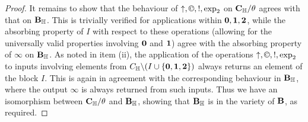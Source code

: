 \documentclass[eqnor,reqno]{amsart}
\theoremstyle{plain}
\theoremstyle{definition}
\newcommand{\cc}{\mathbin{\textup{\copyright}}}
\begin{document}
\begin{proof}
It remains to show that the behaviour of $\uparrow,\cc,!,\exp_2$ on ${\bf C}_\mathbb{H}/\theta$ agrees with that on ${\bf B}_\mathbb{H}$.  This is trivially verified for applications within ${\bf 0},{\bf 1},{\bf 2}$, while the absorbing property of $I$ with respect to these operations (allowing for the universally valid properties involving ${\bf 0}$ and ${\bf 1}$) agree with the absorbing property of $\infty$ on ${\bf B}_\mathbb{H}$.  As noted in item (ii), the application of the operations $\uparrow,\cc,!,\exp_2$ to inputs involving elements from $C_\mathbb{H}\backslash(I\cup\{{\bf 0},{\bf 1},{\bf 2}\})$ always returns an element of the block $I$.  This is again in agreement with the corresponding behaviour in ${\bf B}_\mathbb{H}$, where the output $\infty$ is always returned from such inputs.  Thus we have an isomorphism between ${\bf C}_\mathbb{H}/\theta$ and ${\bf B}_\mathbb{H}$, showing that ${\bf B}_\mathbb{H}$ is in the variety of ${\bf B}$, as required.
\end{proof}
\end{document}
